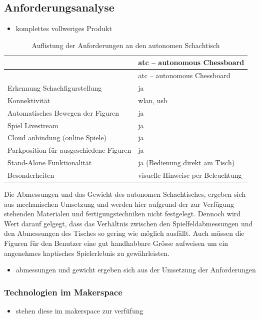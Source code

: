 \hypertarget{anforderungsanalyse}{%
\subsection{Anforderungsanalyse}\label{anforderungsanalyse}}

\begin{itemize}
\tightlist
\item
  komplettes vollweriges Produkt
\end{itemize}

\begin{longtable}[]{@{}ll@{}}
\caption{Auflistung der Anforderungen an den autonomen
Schachtisch}\tabularnewline
\toprule
& \gls{atc} -- autonomous Chessboard\tabularnewline
\midrule
\endfirsthead
\toprule
& \gls{atc} -- autonomous Chessboard\tabularnewline
\midrule
\endhead
Erkennung Schachfigurstellung & ja\tabularnewline
Konnektivität & \gls{wlan}, \gls{usb}\tabularnewline
Automatisches Bewegen der Figuren & ja\tabularnewline
Spiel Livestream & ja\tabularnewline
Cloud anbindung (online Spiele) & ja\tabularnewline
Parkposition für ausgeschiedene Figuren & ja\tabularnewline
Stand-Alone Funktionalität & ja (Bedienung direkt am
Tisch)\tabularnewline
Besonderheiten & visuelle Hinweise per Beleuchtung\tabularnewline
\bottomrule
\end{longtable}

Die Abmessungen und das Gewicht des autonomen Schachtisches, ergeben
sich aus mechanischen Umsetzung und werden hier aufgrund der zur
Verfügung stehenden Materialen und fertigungstechniken nicht festgelegt.
Dennoch wird Wert darauf gelgegt, dass das Verhältnis zwischen den
Spielfeldabmessungen und den Abmessungen des Tisches so gering wie
möglich ausfällt. Auch müssen die Figuren für den Benutzer eine gut
handhabbare Grösse aufweisen um ein angenehmes haptisches Spielerlebnis
zu gewährleisten.

\begin{itemize}
\tightlist
\item
  abmessungen und gewicht ergeben sich aus der Umsetzung der
  Anforderungen
\end{itemize}

\hypertarget{technologien-im-makerspace}{%
\subsubsection{Technologien im
Makerspace}\label{technologien-im-makerspace}}

\begin{itemize}
\tightlist
\item
  stehen diese im makerspace zur verfüfung
\end{itemize}

